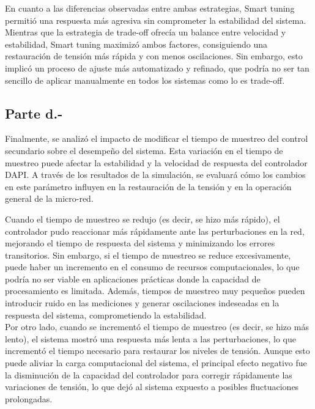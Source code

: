 En cuanto a las diferencias observadas entre ambas estrategias, Smart tuning permitió una respuesta más agresiva sin comprometer la estabilidad del sistema. Mientras que la estrategia de trade-off ofrecía un balance entre velocidad y estabilidad, Smart tuning maximizó ambos factores, consiguiendo una restauración de tensión más rápida y con menos oscilaciones. Sin embargo, esto implicó un proceso de ajuste más automatizado y refinado, que podría no ser tan sencillo de aplicar manualmente en todos los sistemas como lo es trade-off.

\subsection{Parte d.-}

Finalmente, se analizó el impacto de modificar el tiempo de muestreo del control secundario sobre el desempeño del sistema. Esta variación en el tiempo de muestreo puede afectar la estabilidad y la velocidad de respuesta del controlador DAPI. A través de los resultados de la simulación, se evaluará cómo los cambios en este parámetro influyen en la restauración de la tensión y en la operación general de la micro-red.


Cuando el tiempo de muestreo se redujo (es decir, se hizo más rápido), el controlador pudo reaccionar más rápidamente ante las perturbaciones en la red, mejorando el tiempo de respuesta del sistema y minimizando los errores transitorios. Sin embargo, si el tiempo de muestreo se reduce excesivamente, puede haber un incremento en el consumo de recursos computacionales, lo que podría no ser viable en aplicaciones prácticas donde la capacidad de procesamiento es limitada. Además, tiempos de muestreo muy pequeños pueden introducir ruido en las mediciones y generar oscilaciones indeseadas en la respuesta del sistema, comprometiendo la estabilidad.\\

Por otro lado, cuando se incrementó el tiempo de muestreo (es decir, se hizo más lento), el sistema mostró una respuesta más lenta a las perturbaciones, lo que incrementó el tiempo necesario para restaurar los niveles de tensión. Aunque esto puede aliviar la carga computacional del sistema, el principal efecto negativo fue la disminución de la capacidad del controlador para corregir rápidamente las variaciones de tensión, lo que dejó al sistema expuesto a posibles fluctuaciones prolongadas.

